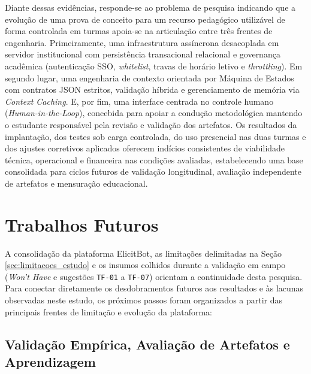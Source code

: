 Diante dessas evidências, responde-se ao problema de pesquisa indicando que a evolução de uma prova de conceito para um recurso pedagógico utilizável de forma controlada em turmas apoia-se na articulação entre três frentes de engenharia. Primeiramente, uma infraestrutura assíncrona desacoplada em servidor institucional com persistência transacional relacional e governança acadêmica (autenticação SSO, \textit{whitelist}, travas de horário letivo e \textit{throttling}). Em segundo lugar, uma engenharia de contexto orientada por Máquina de Estados com contratos JSON estritos, validação híbrida e gerenciamento de memória via \textit{Context Caching}. E, por fim, uma interface centrada no controle humano (\textit{Human-in-the-Loop}), concebida para apoiar a condução metodológica mantendo o estudante responsável pela revisão e validação dos artefatos. Os resultados da implantação, dos testes sob carga controlada, do uso presencial nas duas turmas e dos ajustes corretivos aplicados oferecem indícios consistentes de viabilidade técnica, operacional e financeira nas condições avaliadas, estabelecendo uma base consolidada para ciclos futuros de validação longitudinal, avaliação independente de artefatos e mensuração educacional.

\section{Trabalhos Futuros}
\label{sec:trabalhos_futuros}

A consolidação da plataforma ElicitBot, as limitações delimitadas na Seção \ref{sec:limitacoes_estudo} e os insumos colhidos durante a validação em campo (\textit{Won't Have} e sugestões \texttt{TF-01} a \texttt{TF-07}) orientam a continuidade desta pesquisa. Para conectar diretamente os desdobramentos futuros aos resultados e às lacunas observadas neste estudo, os próximos passos foram organizados a partir das principais frentes de limitação e evolução da plataforma:

\subsection*{Validação Empírica, Avaliação de Artefatos e Aprendizagem}

